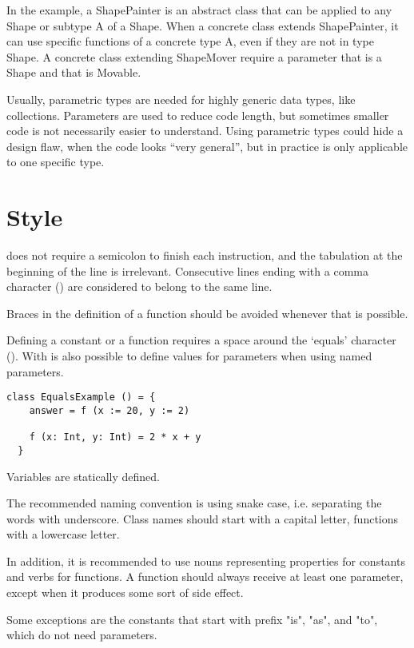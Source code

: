 In the example, a ShapePainter is an abstract class that can be applied to any Shape or subtype A of a Shape.
When a concrete class extends ShapePainter, it can use specific functions of a concrete type A, even if they are not in type Shape.
A concrete class extending ShapeMover require a parameter that is a Shape and that is Movable.

Usually, parametric types are needed for highly generic data types, like collections.
Parameters are used to reduce code length, but sometimes smaller code is not necessarily easier to understand.
Using parametric types could hide a design flaw, when the code looks ``very general'', but in practice is only applicable to one specific type.


\section{Style}

\Soda does not require a semicolon to finish each instruction, and the tabulation at the beginning of the line is irrelevant.
Consecutive lines ending with a comma character (\srccode{,}) are considered to belong to the same line.

Braces in the definition of a function should be avoided whenever that is possible.

Defining a constant or a function requires a space around the `equals' character (\sdef).
With \sdefparam is also possible to define values for parameters when using named parameters.

\begin{lstlisting}[label={lst:exampleFunctionWithoutBraces}]
  class EqualsExample () = {
    answer = f (x := 20, y := 2)

    f (x: Int, y: Int) = 2 * x + y
  }
\end{lstlisting}


Variables are statically defined.

The recommended naming convention is using snake case, i.e. separating the words with underscore.
Class names should start with a capital letter, functions with a lowercase letter.

In addition, it is recommended to use nouns representing properties for constants and verbs for functions.
A function should always receive at least one parameter, except when it produces some sort of side effect.

Some exceptions are the constants that start with prefix "is", "as", and "to", which do not need parameters.


